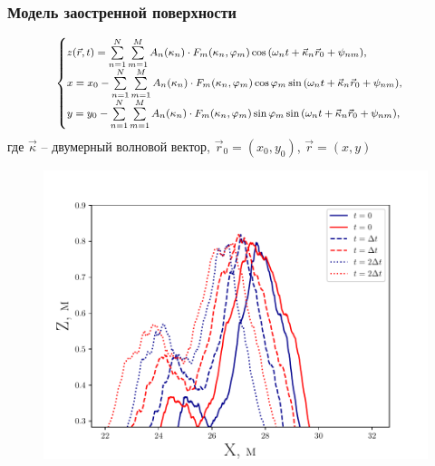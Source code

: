 \documentclass[10pt,pdf,hyperref={unicode}, dvipsnames]{beamer}
\renewcommand{\phi}{\varphi}
\begin{document}
\begin{frame}[t]
    \frametitle{Модель заостренной поверхности}
    \begin{equation}
        \footnotesize
        \begin{cases}
            \label{eq:surface2dcwm}
            z(\vec r,t) = \sum\limits_{n=1}^{N} \sum\limits_{m=1}^{M}
            A_n(\kappa_n) \cdot
            F_m(\kappa_n,\phi_m) \cos \qty(\omega_n t + \vec \kappa_n \vec r_0 +
            \psi_{nm}),    \\
            x = x_0 - \sum\limits_{n=1}^{N} \sum\limits_{m=1}^{M}
            A_n(\kappa_n) \cdot
            F_m(\kappa_n,\phi_m) \cos\phi_m \sin\qty(\omega_n t + \vec \kappa_n \vec r_0 +
            \psi_{nm}),\\
            y = y_{0} - \sum\limits_{n=1}^{N} \sum\limits_{m=1}^{M}
            A_n(\kappa_n) \cdot
            F_m(\kappa_n,\phi_m) \sin \phi_m \sin \qty(\omega_n t + \vec \kappa_n \vec
            r_0 + \psi_{nm}),
        \end{cases}
    \end{equation}
    где $\vec \kappa$ -- двумерный волновой вектор,  
    $\vec r_0 = (x_0, y_0)$, $\vec r = (x, y)$

    \begin{figure}
        \centering
        \includegraphics[height=0.5\textheight]{fig/evolution}
    \end{figure}
\end{frame}
\end{document}
